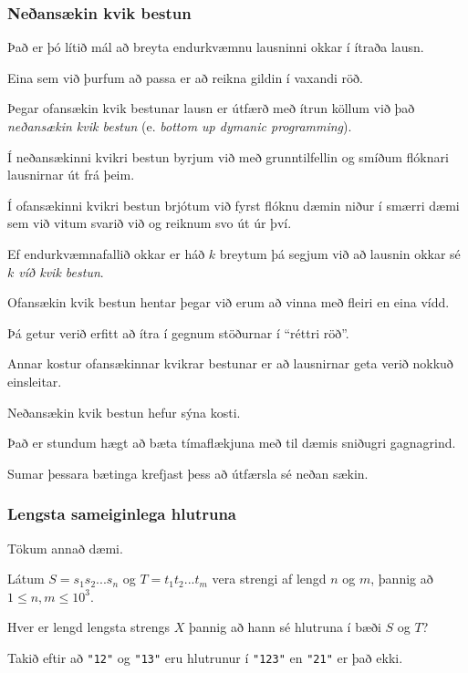 {
	\frametitle{Neðansækin kvik bestun}
	{
		\item<1-> Það er þó lítið mál að breyta endurkvæmnu lausninni okkar í ítraða lausn.
		\item<2-> Eina sem við þurfum að passa er að reikna gildin í vaxandi röð.
		\item<3->[]
		\item<4-> Þegar ofansækin kvik bestunar lausn er útfærð með ítrun köllum við það \emph{neðansækin kvik bestun} 
					(e. \emph{bottom up dymanic programming}).
	}
}

{
	{
		\item<1-> Í neðansækinni kvikri bestun byrjum við með grunntilfellin og smíðum flóknari lausnirnar út frá þeim.
		\item<2-> Í ofansækinni kvikri bestun brjótum við fyrst flóknu dæmin niður í smærri dæmi sem við vitum svarið við og reiknum svo út úr því.
		\item<3-> Ef endurkvæmnafallið okkar er háð $k$ breytum þá segjum við að lausnin okkar sé \emph{$k$ víð kvik bestun}.
		\item<4-> Ofansækin kvik bestun hentar þegar við erum að vinna með fleiri en eina vídd.
		\item<5-> Þá getur verið erfitt að ítra í gegnum stöðurnar í ``réttri röð''.
	}
}

{
	{
		\item<1-> Annar kostur ofansækinnar kvikrar bestunar er að lausnirnar geta verið nokkuð einsleitar.
		\item<2->[]
	}
}

{
	{
		\item<1-> Neðansækin kvik bestun hefur sýna kosti.
		\item<2-> Það er stundum hægt að bæta tímaflækjuna með til dæmis sniðugri gagnagrind.
		\item<3-> Sumar þessara bætinga krefjast þess að útfærsla sé neðan sækin.
	}
}

{
	\frametitle{Lengsta sameiginlega hlutruna}
	{
		\item<1-> Tökum annað dæmi.
		\item<2-> Látum $S = s_1s_2...s_n$ og $T = t_1t_2...t_m$ vera strengi af lengd $n$ og $m$, þannig að $1 \leq n, m \leq 10^3$.
		\item<3-> Hver er lengd lengsta strengs $X$ þannig að hann sé hlutruna í bæði $S$ og $T$?
		\item<4-> Takið eftir að \texttt{"12"} og \texttt{"13"} eru hlutrunur í \texttt{"123"} en \texttt{"21"} er það ekki.
	}
}

